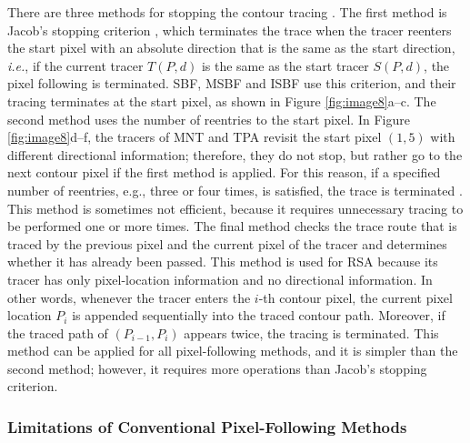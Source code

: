 \documentclass[sensors,article,accept,moreauthors,pdftex,10pt,a4paper]{mdpi}
\begin{document}
There are three methods for stopping the contour tracing \cite{Ghuneim2015Contour,Reddy2012Evaluation}. The first method is Jacob's stopping criterion \cite{Ghuneim2015Contour}, which terminates the trace when the tracer reenters the start pixel with an absolute direction that is the same as the start direction, \emph{i.e.}, if the current tracer $T(P,d)$ is the same as the start tracer $S(P,d)$, the pixel following is terminated. SBF, MSBF and ISBF use this criterion, and their tracing terminates at the start pixel, as shown in Figure \ref{fig:image8}a--c. The second method uses the number of reentries to the start pixel. In Figure \ref{fig:image8}d--f, the tracers of MNT and TPA revisit the start pixel $(1, 5)$ with different directional information; therefore, they do not stop, but rather go to the next contour pixel if the first method is applied. For this reason, if a specified number of reentries, e.g., three or four times, is satisfied, the trace is terminated \cite{Reddy2012Evaluation}. This method is sometimes not efficient, because it requires unnecessary tracing to be performed one or more times. The final method checks the trace route that is traced by the previous pixel and the current pixel of the tracer and determines whether it has already been passed. This method is used for RSA \cite{Ghuneim2015Contour,Mirante1982Radial} because its tracer has only pixel-location information and no directional information. In other words, whenever the tracer enters the $i$-th contour pixel, the current pixel location $P_i$ is appended sequentially into the traced contour path. Moreover, if the traced path of $(P_{i-1}, P_i)$ appears twice, the tracing is terminated. This method can be applied for all pixel-following methods, and it is simpler than the second method; however, it requires more operations than Jacob's stopping criterion.

\subsubsection{Limitations of Conventional Pixel-Following Methods}
\end{document}
